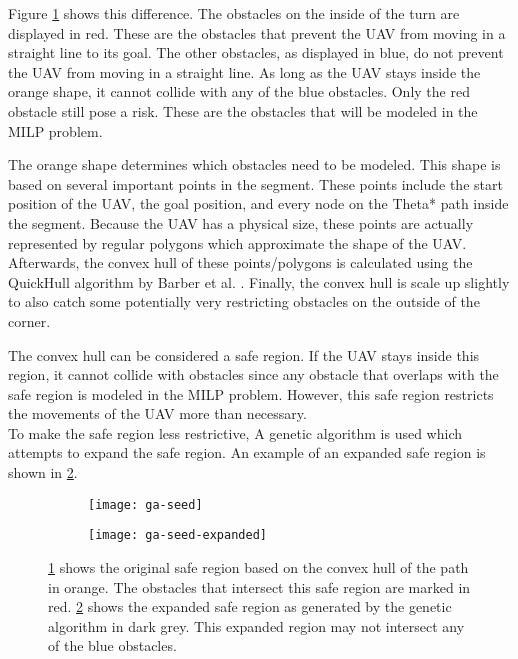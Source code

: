 Figure \ref{fig:ga-seed} shows this difference. The obstacles on the inside of the turn are displayed in red. These are the obstacles that prevent the UAV from moving in a straight line to its goal. The other obstacles, as displayed in blue, do not prevent the UAV from moving in a straight line. As long as the UAV stays inside the orange shape, it cannot collide with any of the blue obstacles. Only the red obstacle still pose a risk. These are the obstacles that will be modeled in the MILP problem.
\par
The orange shape determines which obstacles need to be modeled. This shape is based on several important points in the segment. These points include the start position of the UAV, the goal position, and every node on the Theta* path inside the segment. Because the UAV has a physical size, these points are actually represented by regular polygons which approximate the shape of the UAV. Afterwards, the convex hull of these points/polygons is calculated using the QuickHull algorithm by Barber et al. \cite{Barber1996}. Finally, the convex hull is scale up slightly to also catch some potentially very restricting obstacles on the outside of the corner.
\par
The convex hull can be considered a safe region. If the UAV stays inside this region, it cannot collide with obstacles since any obstacle that overlaps with the safe region is modeled in the MILP problem. However, this safe region restricts the movements of the UAV more than necessary. \\
To make the safe region less restrictive, A genetic algorithm is used which attempts to expand the safe region. An example of an expanded safe region is shown in \ref{fig:ga-seed-expanded}.

\begin{figure}
	\centering
	\begin{subfigure}[t]{0.45\columnwidth}
        		\texttt{[image: ga-seed]}
        		\caption{}
        		 \label{fig:ga-seed}
	\end{subfigure}	
	\hfill
	\begin{subfigure}[t]{0.45\columnwidth}
        		\texttt{[image: ga-seed-expanded]}
        		\caption{}
        		 \label{fig:ga-seed-expanded}
	\end{subfigure}		
	\caption[A demonstration of the input and output of the genetic algorithm]{\ref{fig:ga-seed} shows the original safe region based on the convex hull of the path in orange. The obstacles that intersect this safe region are marked in red. \ref{fig:ga-seed-expanded} shows the expanded safe region as generated by the genetic algorithm in dark grey. This expanded region may not intersect any of the blue obstacles.}
    \label{fig:ga-seed-demo}     
\end{figure}

